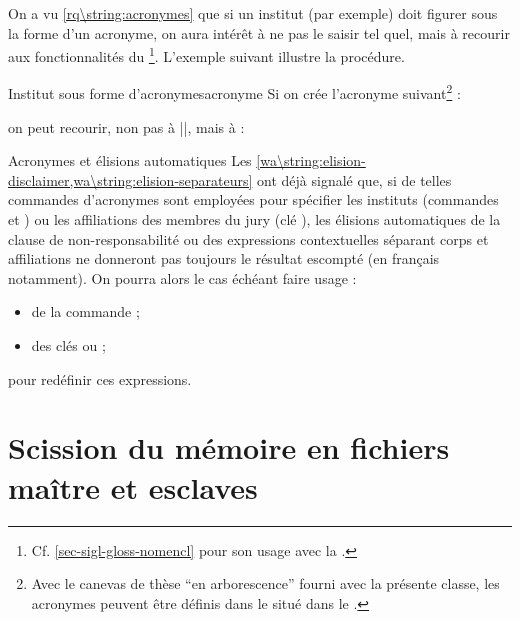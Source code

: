 On a vu \vref{rq\string:acronymes} que si un institut (par exemple) doit figurer
sous la forme d'un acronyme, on aura intérêt à ne pas le saisir tel
quel, mais à recourir aux fonctionnalités du
\footnote{Cf. \vref{sec-sigl-gloss-nomencl} pour
  son usage avec la \yatcl.}. L'exemple suivant illustre la
procédure.
%
\begin{dbexample}{Institut sous forme d'acronymes}{acronyme}
  Si on crée l'acronyme suivant\footnote{Avec le canevas de thèse \enquote{en
      arborescence} fourni avec la présente classe, les acronymes peuvent être
    définis dans le \File{\acronymsfile} situé dans le
    \Folder{\auxiliarydirectory}.} :
\begin{preamblecode}
\end{preamblecode}
on peut recourir, non pas à ||, mais à :
\begin{preamblecode}
\end{preamblecode}
\end{dbexample}

\begin{dbremark}{Acronymes et élisions automatiques}{}
  Les \vref{wa\string:elision-disclaimer,wa\string:elision-separateurs} ont déjà
  signalé que, si de telles commandes d'acronymes sont employées pour spécifier
  les instituts (commandes  et ) ou les
  affiliations des membres du jury (clé ), les élisions
  automatiques de la clause de non-responsabilité ou des expressions
  contextuelles séparant corps et affiliations ne donneront pas toujours le
  résultat escompté (en français notamment). On pourra alors le cas échéant
  faire usage :
  \begin{itemize}
  \item de la commande  ;
  \item des clés  ou  ;
  \end{itemize}
  pour redéfinir ces expressions.
\end{dbremark}

\section{Scission du mémoire en fichiers maître et esclaves}
\label{sec-repart-du-memo}

